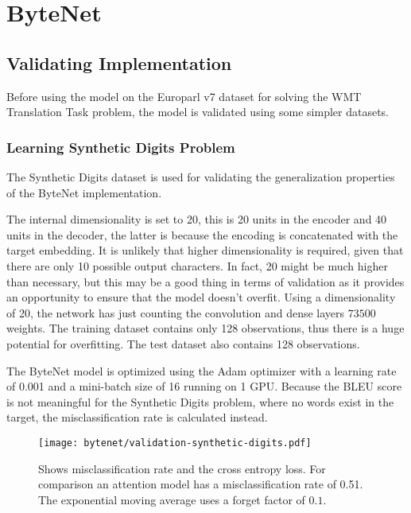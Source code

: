 
\section{ByteNet}

\subsection{Validating Implementation}

Before using the model on the Europarl v7 dataset for solving the WMT Translation Task problem, the model is validated using some simpler datasets.

\subsubsection{Learning Synthetic Digits Problem}

The Synthetic Digits dataset is used for validating the generalization properties of the ByteNet implementation.

The internal dimensionality is set to 20, this is 20 units in the encoder and 40 units in the decoder, the latter is because the encoding is concatenated with the target embedding. It is unlikely that higher dimensionality is required, given that there are only 10 possible output characters. In fact, 20 might be much higher than necessary, but this may be a good thing in terms of validation as it provides an opportunity to ensure that the model doesn't overfit. Using a dimensionality of 20, the network has just counting the convolution and dense layers $73500$ weights. The training dataset contains only 128 observations, thus there is a huge potential for overfitting. The test dataset also contains 128 observations.

The ByteNet model is optimized using the Adam optimizer with a learning rate of 0.001 and a mini-batch size of 16 running on 1 GPU. Because the BLEU score is not meaningful for the Synthetic Digits problem, where no words exist in the target, the misclassification rate is calculated instead.

\begin{figure}[h]
    \centering
    \texttt{[image: bytenet/validation-synthetic-digits.pdf]}
    \caption{Shows misclassification rate and the cross entropy loss. For comparison an attention model has a misclassification rate of 0.51. The exponential moving average uses a forget factor of $0.1$.}
    \label{fig:result:bytenet:digits}
\end{figure}

